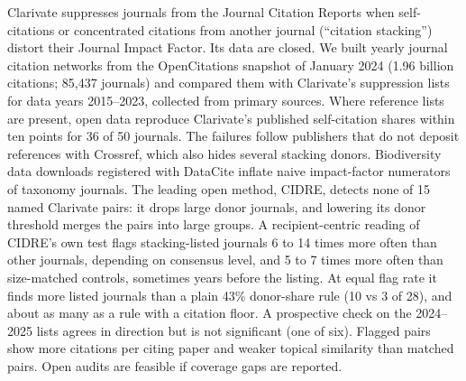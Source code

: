 Clarivate suppresses journals from the Journal Citation Reports when self-citations or concentrated citations from
another journal (``citation stacking'') distort their Journal Impact Factor. Its data are closed. We built yearly
journal citation networks from the OpenCitations snapshot of January 2024 (1.96 billion citations; 85,437 journals)
and compared them with Clarivate's suppression lists for data years 2015--2023, collected from primary sources. Where
reference lists are present, open data reproduce Clarivate's published self-citation shares within ten
points for 36 of 50 journals. The failures follow publishers that do not deposit references with Crossref, which also
hides several stacking donors. Biodiversity data downloads registered with DataCite inflate naive impact-factor
numerators of taxonomy journals. The leading open method, CIDRE, detects none of 15 named
Clarivate pairs: it drops large donor journals, and lowering its donor threshold merges the pairs into large groups. A recipient-centric reading of CIDRE's own test flags stacking-listed journals 6 to 14 times more often than
other journals, depending on consensus level, and 5 to 7 times more often than size-matched controls, sometimes years
before the listing. At equal flag rate it finds more listed journals than a plain 43\% donor-share rule (10 vs 3 of
28), and about as many as a rule with a citation floor. A prospective check on the 2024--2025 lists agrees in
direction but is not significant (one of six). Flagged pairs show more citations per citing paper and weaker topical
similarity than matched pairs. Open audits are feasible if coverage gaps are reported.
